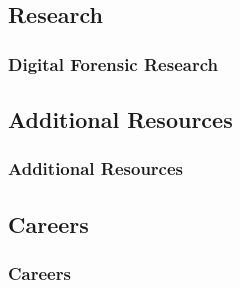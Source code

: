 \documentclass{beamer}
\begin{document}
\begin{frame}
	\section{Research}
	\frametitle{Digital Forensic Research}
\end{frame}

\begin{frame}
	\section{Additional Resources}
	\frametitle{Additional Resources}
	
\end{frame}

\begin{frame}
	\section{Careers}
	\frametitle{Careers}
	
\end{frame}
\end{document}
